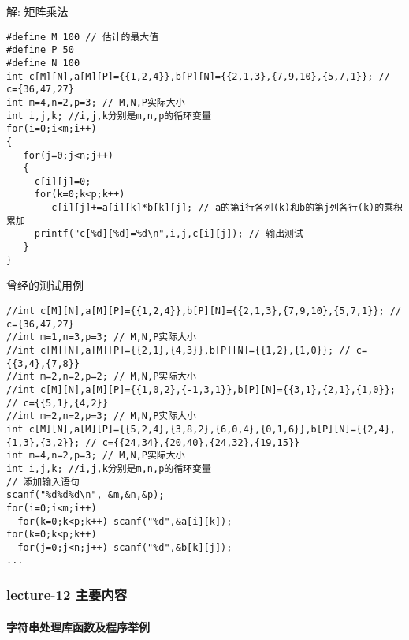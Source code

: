 \begin{frame}{解: 矩阵乘法}
\begin{lstlisting}
#define M 100 // 估计的最大值
#define P 50
#define N 100 
int c[M][N],a[M][P]={{1,2,4}},b[P][N]={{2,1,3},{7,9,10},{5,7,1}}; // c={36,47,27}
int m=4,n=2,p=3; // M,N,P实际大小
int i,j,k; //i,j,k分别是m,n,p的循环变量 
for(i=0;i<m;i++) 
{
   for(j=0;j<n;j++)
   {
     c[i][j]=0;
     for(k=0;k<p;k++) 
        c[i][j]+=a[i][k]*b[k][j]; // a的第i行各列(k)和b的第j列各行(k)的乘积累加 
     printf("c[%d][%d]=%d\n",i,j,c[i][j]); // 输出测试
   }
}
\end{lstlisting}
\end{frame}

\begin{frame}
\small{曾经的测试用例}
\begin{lstlisting}
//int c[M][N],a[M][P]={{1,2,4}},b[P][N]={{2,1,3},{7,9,10},{5,7,1}}; // c={36,47,27}
//int m=1,n=3,p=3; // M,N,P实际大小
//int c[M][N],a[M][P]={{2,1},{4,3}},b[P][N]={{1,2},{1,0}}; // c={{3,4},{7,8}}
//int m=2,n=2,p=2; // M,N,P实际大小
//int c[M][N],a[M][P]={{1,0,2},{-1,3,1}},b[P][N]={{3,1},{2,1},{1,0}}; // c={{5,1},{4,2}}
//int m=2,n=2,p=3; // M,N,P实际大小
int c[M][N],a[M][P]={{5,2,4},{3,8,2},{6,0,4},{0,1,6}},b[P][N]={{2,4},{1,3},{3,2}}; // c={{24,34},{20,40},{24,32},{19,15}}
int m=4,n=2,p=3; // M,N,P实际大小
int i,j,k; //i,j,k分别是m,n,p的循环变量  
// 添加输入语句
scanf("%d%d%d\n", &m,&n,&p);
for(i=0;i<m;i++)
  for(k=0;k<p;k++) scanf("%d",&a[i][k]);
for(k=0;k<p;k++)
  for(j=0;j<n;j++) scanf("%d",&b[k][j]);
...
\end{lstlisting}
\end{frame}  

\begin{frame}[shrink]
\frametitle{lecture-12 主要内容}
\framesubtitle{字符串处理库函数及程序举例}
\tableofcontents
\end{frame}               






